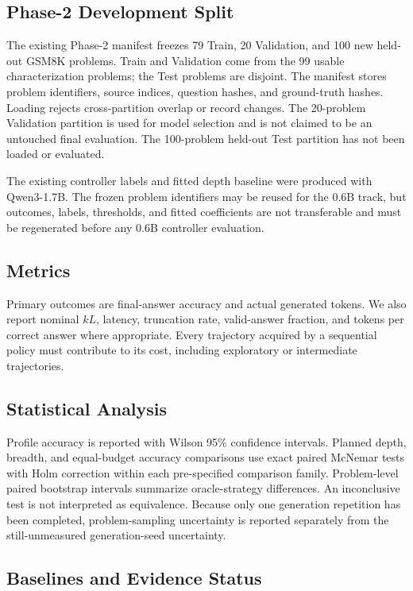 \documentclass[runningheads]{llncs}
\begin{document}
\subsection{Phase-2 Development Split}

The existing Phase-2 manifest freezes 79 Train, 20 Validation, and 100 new
held-out GSM8K problems. Train and Validation come from the 99 usable
characterization problems; the Test problems are disjoint. The manifest stores
problem identifiers, source indices, question hashes, and ground-truth hashes.
Loading rejects cross-partition overlap or record changes. The 20-problem
Validation partition is used for model selection and is not claimed to be an
untouched final evaluation. The 100-problem held-out Test partition has not
been loaded or evaluated.

The existing controller labels and fitted depth baseline were produced with
Qwen3-1.7B. The frozen problem identifiers may be reused for the 0.6B track,
but outcomes, labels, thresholds, and fitted coefficients are not transferable
and must be regenerated before any 0.6B controller evaluation.

\subsection{Metrics}

Primary outcomes are final-answer accuracy and actual generated tokens. We also
report nominal $kL$, latency, truncation rate, valid-answer fraction, and
tokens per correct answer where appropriate. Every trajectory acquired by a
sequential policy must contribute to its cost, including exploratory or
intermediate trajectories.

\subsection{Statistical Analysis}

Profile accuracy is reported with Wilson 95\% confidence intervals. Planned
depth, breadth, and equal-budget accuracy comparisons use exact paired McNemar
tests with Holm correction within each pre-specified comparison family.
Problem-level paired bootstrap intervals summarize oracle-strategy differences.
An inconclusive test is not interpreted as equivalence. Because only one
generation repetition has been completed, problem-sampling uncertainty is
reported separately from the still-unmeasured generation-seed uncertainty.

\subsection{Baselines and Evidence Status}
\end{document}
